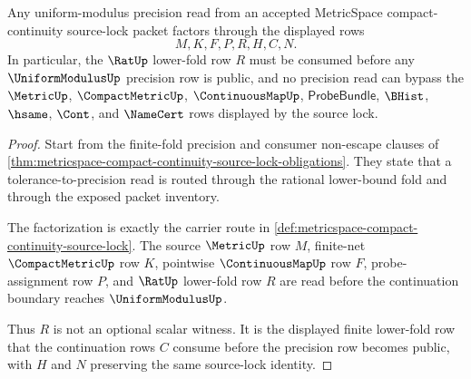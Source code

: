 \begin{theorem}
\label{thm:metricspace-source-lock-uniform-modulus-nonescape}
Any uniform-modulus precision read from an accepted MetricSpace compact-continuity source-lock packet factors through the displayed rows
$$
M,K,F,P,R,H,C,N.
$$
In particular, the $\RatUp$ lower-fold row $R$ must be consumed before any $\UniformModulusUp$ precision row is public, and no precision read can bypass the $\MetricUp$, $\CompactMetricUp$, $\ContinuousMapUp$, $\mathsf{ProbeBundle}$, $\BHist$, $\hsame$, $\Cont$, and $\NameCert$ rows displayed by the source lock.
\end{theorem}
\begin{proof}
Start from the finite-fold precision and consumer non-escape clauses of \autoref{thm:metricspace-compact-continuity-source-lock-obligations}. They state that a tolerance-to-precision read is routed through the rational lower-bound fold and through the exposed packet inventory.

The factorization is exactly the carrier route in \autoref{def:metricspace-compact-continuity-source-lock}. The source $\MetricUp$ row $M$, finite-net $\CompactMetricUp$ row $K$, pointwise $\ContinuousMapUp$ row $F$, probe-assignment row $P$, and $\RatUp$ lower-fold row $R$ are read before the continuation boundary reaches $\UniformModulusUp$.

Thus $R$ is not an optional scalar witness. It is the displayed finite lower-fold row that the continuation rows $C$ consume before the precision row becomes public, with $H$ and $N$ preserving the same source-lock identity.
\end{proof}


\begin{closurestatus}{}
  \theoryclosure{\seedClosure}
  \formalstatus{\unformalizedV}
\end{closurestatus}
